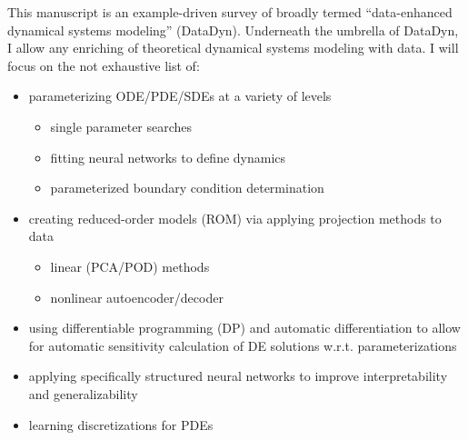 This manuscript is an example-driven survey of broadly termed ``data-enhanced dynamical systems modeling'' (DataDyn). Underneath the umbrella of DataDyn, I allow any enriching of theoretical dynamical systems modeling with data. I will focus on the not exhaustive list of:
\begin{itemize}
\item parameterizing ODE/PDE/SDEs at a variety of levels
  \begin{itemize}
  \item single parameter searches 
  \item fitting neural networks to define dynamics
  \item parameterized boundary condition determination
  \end{itemize}
\item creating reduced-order models (ROM) via applying projection methods to data
  \begin{itemize}
  \item linear (PCA/POD) methods
  \item nonlinear autoencoder/decoder
  \end{itemize}
\item using differentiable programming (DP) and automatic differentiation to allow for automatic sensitivity calculation of DE solutions w.r.t. parameterizations
\item applying specifically structured neural networks to improve interpretability and generalizability
\item learning discretizations for PDEs
\end{itemize}
